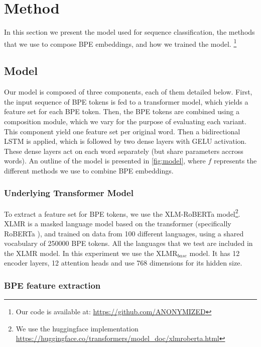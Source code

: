 \documentclass[11pt]{article}
\newcommand\citep{\cite}
\begin{document}
	\section{Method}
	\label{method}
    	In this section we present the model used for sequence
     classification, the methods that we use to compose BPE
     embeddings, and how we trained the model. \footnote{Our code is
     available at: \url{https://github.com/ANONYMIZED}}

	\subsection{Model}

        Our model is composed of three components, each of them
        detailed below. First, the input sequence of BPE tokens is fed
        to a transformer model, which yields a feature set for each
        BPE token. Then, the BPE tokens are combined using a
        composition module, which we vary for the purpose of
        evaluating each variant. This component yield one feature set
        per original word. Then a bidirectional LSTM is applied, which
        is followed by two dense layers with GELU \citep{hendrycks2016gaussian}
        activation. These dense layers act on each word separately (but
        share parameters accross words).  An outline of the model is
        presented in \cref{fig:model}, where $f$ represents the
        different methods we use to combine BPE embeddings.

	\subsubsection{Underlying Transformer Model}
     To extract a feature set for BPE tokens, we use the
     XLM-RoBERTa \cite{conneau2019unsupervised} model\footnote{We use the
     huggingface implementation
     \url{https://huggingface.co/transformers/model_doc/xlmroberta.html}}. XLMR
     is a masked language model based on the transformer
     (specifically RoBERTa \citep{liu2019roberta}), and trained on
     data from 100 different languages, using a shared vocabulary of
     250000 BPE tokens. All the languages that we test are included in the
     XLMR model. In this experiment we use the \textsc{XLMR}$_{base}$
     model. It has 12 encoder layers, 12 attention heads and use 768
     dimensions for its hidden size.

	\subsubsection{BPE feature extraction}
        \label{sec:bpe-features}
\end{document}

